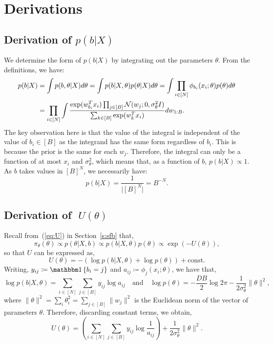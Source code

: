 \section{Derivations}

\subsection{Derivation of {\boldmath $p(b|X)$}}
\label{appdx:b|x}

We determine the form of $p(b| X)$ by integrating
out the parameters $\theta$. From the definitions, we have:
%
\begin{align*}
	p(b | X) 
	&= \int p(b , \theta| X) d\theta 
	= \int p(b | X, \theta) p(\theta | X) d\theta
	= \int \prod_{i \in [N] } \phi_{b_i}(x_i; \theta) p(\theta) d\theta \\
	&= \prod_{i \in [N]} \int \frac{\exp(w_{b_i}^T x_i) \prod_{j \in [B]} \mathcal{N}(w_j; 0, \sigma_\theta^2 I)}{\sum_{k \in [B]} \exp(w_{k}^T x_i)} dw_{1:B}.
\end{align*}
%
The key observation here is that 
the value of the integral is independent
of the value of $b_i \in [B]$ as
the integrand has the same form regardless of $b_i$. This is
because the prior is the same for each $w_j$. 
Therefore, the integral can only be a function of at most $x_i$ and $\sigma_\theta^2$,
which means that, as a function of $b$, $p(b|X)\propto 1$. As
$b$ takes values in $[B]^N$, we necessarily have:
%
\begin{equation}
	p(b | X) = \frac{1}{\big|[B]^N\big|}=B^{-N}.
\end{equation}

\subsection{Derivation of {\boldmath $\;U(\theta)$}}
\label{appdx:form-U}

Recall from~(\ref{eq:U}) in Section~\ref{s:sfb} that,
$$	\pi_\theta(\theta) \propto p(\theta | X, b) \propto p(b | X, \theta) p(\theta) \propto  \exp \left( - U(\theta) \right),
$$ 
so that $U$ can be expressed as,
$$
U(\theta) 
= - \left( \log p(b | X, \theta) + \log p(\theta) \right) + \textrm{const}.
$$
Writing,
$y_{ij} \coloneqq \one \left\{ b_i = j \right\}$ and 
$a_{ij} \coloneqq \phi_j(x_i; \theta)$, we have that,
%
\begin{equation}
	\log p(b | X, \theta) = \sum_{i \in [N]} \sum_{j \in [B]} y_{ij} \log a_{ij}  \quad \textrm{and} \quad
	\log p(\theta) = -\frac{D B}{2} \log 2\pi - \frac{1}{2 \sigma_\theta^2} 
	\|\theta \|^2,
	\label{eqn:U-constituent-terms}
\end{equation}
%
where
$\|\theta\|^2 = \sum_{i} \theta_{i}^2 = \sum_{j \in [B]} \|w_j\|^2$ 
is the Euclidean norm of the vector of parameters $\theta$.
Therefore, discarding constant terms, we 
obtain,
%
\begin{equation}
	U(\theta) = \left( \sum_{i \in [N]} \sum_{j \in [B]} y_{ij} \log \frac{1}{a_{ij}} \right)
	+ \frac{1}{2\sigma_\theta^2} \|\theta\|^2.
\end{equation}

